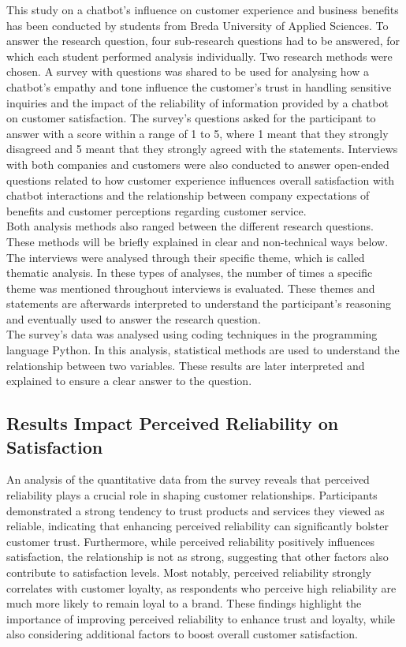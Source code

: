 \documentclass[a4paper]{article}
\begin{document}
This study on a chatbot's influence on customer experience and business benefits has been conducted by students from Breda University of Applied Sciences. To answer the research question, four sub-research questions had to be answered, for which each student performed analysis individually. Two research methods were chosen. A survey with questions was shared to be used for analysing how a chatbot's empathy and tone influence the customer's trust in handling sensitive inquiries and the impact of the reliability of information provided by a chatbot on customer satisfaction. The survey's questions asked for the participant to answer with a score within a range of 1 to 5, where 1 meant that they strongly disagreed and 5 meant that they strongly agreed with the statements. Interviews with both companies and customers were also conducted to answer open-ended questions related to how customer experience influences overall satisfaction with chatbot interactions and the relationship between company expectations of benefits and customer perceptions regarding customer service. 
\\
Both analysis methods also ranged between the different research questions. These methods will be briefly explained in clear and non-technical ways below.
\\
The interviews were analysed through their specific theme, which is called thematic analysis. In these types of analyses, the number of times a specific theme was mentioned throughout interviews is evaluated. These themes and statements are afterwards interpreted to understand the participant's reasoning and eventually used to answer the research question. 
\\
The survey's data was analysed using coding techniques in the programming language Python. In this analysis, statistical methods are used to understand the relationship between two variables. These results are later interpreted and explained to ensure a clear answer to the question.

\subsection{Results Impact Perceived Reliability on Satisfaction}

An analysis of the quantitative data from the survey reveals that perceived reliability plays a crucial role in shaping customer relationships. Participants demonstrated a strong tendency to trust products and services they viewed as reliable, indicating that enhancing perceived reliability can significantly bolster customer trust. Furthermore, while perceived reliability positively influences satisfaction, the relationship is not as strong, suggesting that other factors also contribute to satisfaction levels. Most notably, perceived reliability strongly correlates with customer loyalty, as respondents who perceive high reliability are much more likely to remain loyal to a brand. These findings highlight the importance of improving perceived reliability to enhance trust and loyalty, while also considering additional factors to boost overall customer satisfaction.
\end{document}
